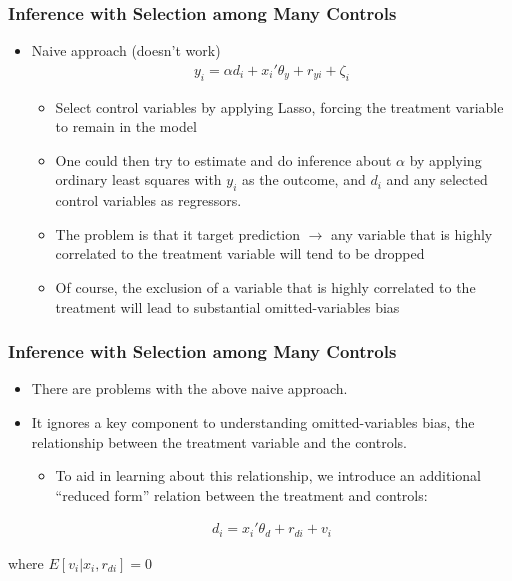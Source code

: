 \documentclass[
  shownotes,
  xcolor={svgnames},
  hyperref={colorlinks,citecolor=DarkBlue,linkcolor=DarkRed,urlcolor=DarkBlue}
  , aspectratio=169]{beamer}
\begin{document}
\begin{frame}[fragile]
\frametitle{Inference with Selection among Many Controls}


\begin{itemize}
  \item Naive approach (doesn't work)
  \begin{align}
    y_i = \alpha d_i + x_i'\theta_y +r_{yi} + \zeta_i
  \end{align}
  \begin{itemize}
  \item Select control variables by applying Lasso, forcing the treatment variable to remain in the model
  \medskip
  \item  One could then try to estimate and do inference about $\alpha$ by applying ordinary least squares with $y_i$ as the outcome, and $d_i$ and any selected control variables as regressors. 
  \medskip
  \item The problem is that it target prediction $\rightarrow$ any variable that is highly correlated to the treatment variable will tend to be dropped 
  \medskip
  \item  Of course, the exclusion of a variable that is highly correlated to the treatment will lead to substantial omitted-variables bias 
  \end{itemize}
\end{itemize}

\end{frame}
\begin{frame}[fragile]
\frametitle{Inference with Selection among Many Controls}
\begin{itemize}
\item There are problems with the above naive approach. 
\bigskip
\item It ignores a key component to understanding omitted-variables bias, the relationship between the treatment variable and the controls. 
\medskip
\begin{itemize}
  \item To aid in learning about this relationship, we introduce an additional “reduced form” relation between the treatment and controls:
\end{itemize}


\begin{align}
d_i = x_i'\theta_d + r_{di}+v_i
\end{align}
\end{itemize}

 where $E[v_i|x_i,r_{di}]=0$



\end{frame}
\end{document}
